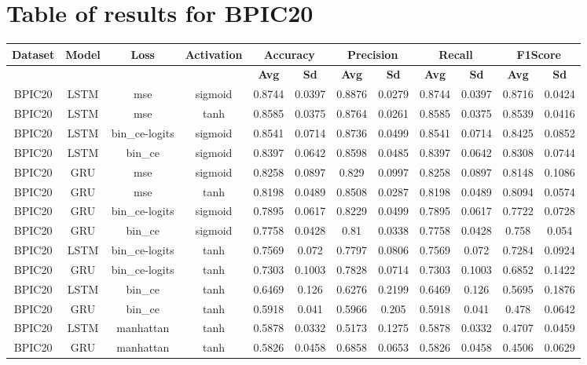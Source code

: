 \documentclass{article}%
\begin{document}
\section{Table of results for BPIC20}%
\label{sec:TableofresultsforBPIC20}%
\begin{tabular}{|c|c|c|c|c|c|c|c|c|c|c|c|}%
\hline%
\rowcolor{lightgray!70}%
\textbf{Dataset}&\textbf{Model}&\textbf{Loss}&\textbf{Activation}&\multicolumn{2}{c|}{\textbf{Accuracy}}&\multicolumn{2}{c|}{\textbf{Precision}}&\multicolumn{2}{c|}{\textbf{Recall}}&\multicolumn{2}{c|}{\textbf{F1Score}}\\%
\hline%
\rowcolor{lightgray!70}%
\textbf{}&\textbf{}&\textbf{}&\textbf{}&\textbf{Avg}&\textbf{Sd}&\textbf{Avg}&\textbf{Sd}&\textbf{Avg}&\textbf{Sd}&\textbf{Avg}&\textbf{Sd}\\%
\hline%
BPIC20&LSTM&mse&sigmoid&0.8744&0.0397&0.8876&0.0279&0.8744&0.0397&0.8716&0.0424\\%
\hline%
BPIC20&LSTM&mse&tanh&0.8585&0.0375&0.8764&0.0261&0.8585&0.0375&0.8539&0.0416\\%
\hline%
BPIC20&LSTM&bin\_ce{-}logits&sigmoid&0.8541&0.0714&0.8736&0.0499&0.8541&0.0714&0.8425&0.0852\\%
\hline%
BPIC20&LSTM&bin\_ce&sigmoid&0.8397&0.0642&0.8598&0.0485&0.8397&0.0642&0.8308&0.0744\\%
\hline%
BPIC20&GRU&mse&sigmoid&0.8258&0.0897&0.829&0.0997&0.8258&0.0897&0.8148&0.1086\\%
\hline%
BPIC20&GRU&mse&tanh&0.8198&0.0489&0.8508&0.0287&0.8198&0.0489&0.8094&0.0574\\%
\hline%
BPIC20&GRU&bin\_ce{-}logits&sigmoid&0.7895&0.0617&0.8229&0.0499&0.7895&0.0617&0.7722&0.0728\\%
\hline%
BPIC20&GRU&bin\_ce&sigmoid&0.7758&0.0428&0.81&0.0338&0.7758&0.0428&0.758&0.054\\%
\hline%
BPIC20&LSTM&bin\_ce{-}logits&tanh&0.7569&0.072&0.7797&0.0806&0.7569&0.072&0.7284&0.0924\\%
\hline%
BPIC20&GRU&bin\_ce{-}logits&tanh&0.7303&0.1003&0.7828&0.0714&0.7303&0.1003&0.6852&0.1422\\%
\hline%
BPIC20&LSTM&bin\_ce&tanh&0.6469&0.126&0.6276&0.2199&0.6469&0.126&0.5695&0.1876\\%
\hline%
BPIC20&GRU&bin\_ce&tanh&0.5918&0.041&0.5966&0.205&0.5918&0.041&0.478&0.0642\\%
\hline%
BPIC20&LSTM&manhattan&tanh&0.5878&0.0332&0.5173&0.1275&0.5878&0.0332&0.4707&0.0459\\%
\hline%
BPIC20&GRU&manhattan&tanh&0.5826&0.0458&0.6858&0.0653&0.5826&0.0458&0.4506&0.0629\\%

\end{tabular}
\end{document}
